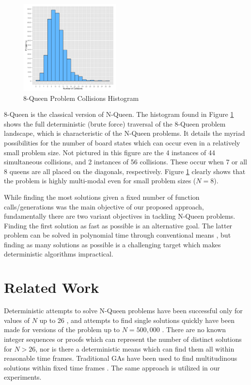 \documentclass[conference]{IEEEtran}
\begin{document}
\begin{figure}[h!]
\centerline{\includegraphics[width=0.45\textwidth]{figures/8_queens_histogram.png}}
\vspace{-12pt}
\caption{8-Queen Problem Collisions Histogram}
\label{fig:histogram}
\end{figure}

8-Queen is the classical version of N-Queen. The histogram found in Figure \ref{fig:histogram} shows the full deterministic (brute force) traversal of the 8-Queen problem landscape, which is characteristic of the N-Queen problems. It details the myriad possibilities for the number of board states which can occur even in a relatively small problem size. Not pictured in this figure are the 4 instances of 44 simultaneous collisions, and 2 instances of 56 collisions. These occur when 7 or all 8 queens are all placed on the diagonals, respectively. Figure \ref{fig:histogram} clearly shows that the problem is highly multi-modal even for small problem sizes ($N = 8$).

While finding the most solutions given a fixed number of function calls/generations was the main objective of our proposed approach, fundamentally there are two variant objectives in tackling N-Queen problems. Finding the first solution as fast as possible is an alternative goal. The latter problem can be solved in polynomial time through conventional means \cite{cit:22,cit:23}, but finding as many solutions as possible is a challenging target which makes deterministic algorithms impractical.

\section{Related Work}
Deterministic attempts to solve N-Queen problems have been successful only for values of $N$ up to 26 \cite{cit:20}, and attempts to find single solutions quickly have been made for versions of the problem up to {$N = 500,000$} \cite{cit:21}. There are no known integer sequences or proofs which can represent the number of distinct solutions for $N > 26$, nor is there a deterministic means which can find them all within reasonable time frames. Traditional GAs have been used to find multitudinous solutions within fixed time frames \cite{cit:9,cit:10}. The same approach is utilized in our experiments.
\end{document}
